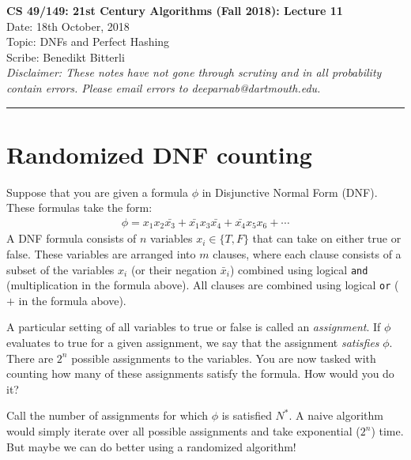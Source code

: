 \documentclass[11pt]{article}
\begin{document}
	\begin{center}
		{\bf \Large CS 49/149: 21st Century Algorithms (Fall 2018): Lecture 11}\\ 
		Date: 18th October, 2018 \\
		Topic: DNFs and Perfect Hashing \\
		Scribe: Benedikt Bitterli \\
		{\em Disclaimer: These notes have not gone through scrutiny and in all probability contain errors. Please email errors to deeparnab@dartmouth.edu.}
	\end{center}
\hrule height 2pt
\vspace{3ex}
\def\loss{\mathsf{loss}}
\section{Randomized DNF counting}

Suppose that you are given a formula $\phi$ in Disjunctive Normal Form (DNF). These formulas take the form:
%
\begin{align*}
    \phi = x_1 x_2 \bar{x_3} + \bar{x_1}x_3 \bar{x_4} + \bar{x_4} x_5 x_6 + \cdots
\end{align*}
%
A DNF formula consists of $n$ variables $x_i\in \{T, F\}$ that can take on either true or false. These variables are arranged into $m$ clauses, where each clause consists of a subset of the variables $x_i$ (or their negation $\bar{x}_i$) combined using logical \verb|and| (multiplication in the formula above). All clauses are combined using logical \verb|or| ($+$ in the formula above).

A particular setting of all variables to true or false is called an \emph{assignment}. If $\phi$ evaluates to true for a given assignment, we say that the assignment \emph{satisfies} $\phi$. There are $2^n$ possible assignments to the variables. You are now tasked with counting how many of these assignments satisfy the formula. How would you do it?

Call the number of assignments for which $\phi$ is satisfied $N^*$. A naive algorithm would simply iterate over all possible assignments and take exponential ($2^n$) time. But maybe we can do better using a randomized algorithm!
\end{document}

